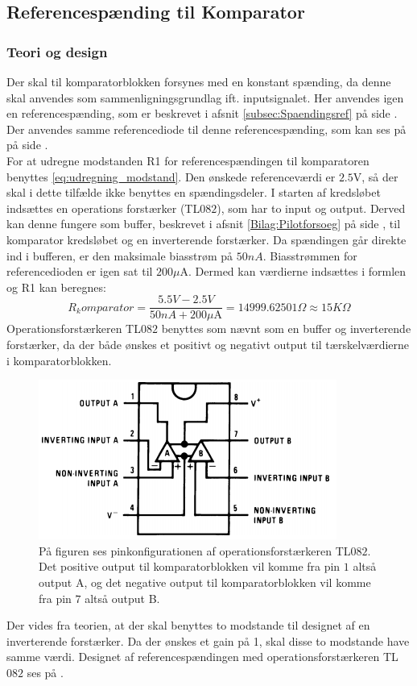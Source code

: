\subsection{Referencespænding til Komparator}\label{subsec:Spaendingsref_Komparator}
\subsubsection{Teori og design}
Der skal til komparatorblokken forsynes med en konstant spænding, da denne skal anvendes som sammenligningsgrundlag ift. inputsignalet. Her anvendes igen en referencespænding, som er beskrevet i afsnit \ref{subsec:Spaendingsref} på side \pageref{subsec:Spaendingsref}. Der anvendes samme referencediode til denne referencespænding, som kan ses på  på side \pageref{subsec:Spaendingsref}. \\
For at udregne modstanden R1 for referencespændingen til komparatoren benyttes \eqref{eq:udregning_modstand}. Den ønskede referenceværdi er $2.5$V, så der skal i dette tilfælde ikke benyttes en spændingsdeler. I starten af kredsløbet indsættes en operations forstærker (TL$082$), som har to input og output. \cite{Corporation2013} Derved kan denne fungere som buffer, beskrevet i afsnit \ref{Bilag:Pilotforsoeg} på side \pageref{Bilag:Pilotforsoeg}, til komparator kredsløbet og en inverterende forstærker.\cite{Schaumann2014} Da spændingen går direkte ind i bufferen, er den maksimale biasstrøm på $50nA$. Biasstrømmen for referencedioden er igen sat til $200\mu$A. Dermed kan værdierne indsættes i formlen og R1 kan beregnes:
\begin{equation}
R_komparator = \frac{5.5V-2.5V}{50nA + 200\mu\text{A}} = 14999.62501\Omega \approx 15K\Omega 
\end{equation} 
Operationsforstærkeren TL$082$ benyttes som nævnt som en buffer og inverterende forstærker, da der både ønskes et positivt og negativt output til tærskelværdierne i komparatorblokken.
\begin{figure}[H]
	\centering
	\includegraphics[scale=0.65]{figures/cProblemloesning/TL082.PNG}
	\caption{På figuren ses pinkonfigurationen af operationsforstærkeren TL$082$. Det positive output til komparatorblokken vil komme fra pin $1$ altså output A, og det negative output til komparatorblokken vil komme fra pin $7$ altså output B. \cite{Corporation2013}}
	\label{fig:TL082}
\end{figure}
\noindent Der vides fra teorien, at der skal benyttes to modstande til designet af en inverterende forstærker. Da der ønskes et gain på 1, skal disse to modstande have samme værdi. \cite{Nilsson2011} Designet af referencespændingen med operationsforstærkeren TL$082$ ses på .

